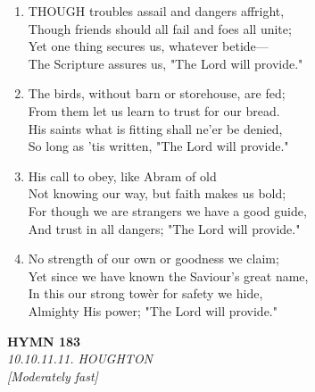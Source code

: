 \documentclass[11pt,a4paper]{article}
\begin{document}
\begin{enumerate}
    \item THOUGH troubles assail and dangers affright, \\
        Though friends should all fail and foes all unite; \\
        Yet one thing secures us, whatever betide--- \\
        The Scripture assures us, "The Lord will provide."

    \item The birds, without barn or storehouse, are fed; \\
        From them let us learn to trust for our bread. \\
        His saints what is fitting shall ne'er be denied, \\
        So long as 'tis written, "The Lord will provide."

    \item His call to obey, like Abram of old \\
        Not knowing our way, but faith makes us bold; \\
        For though we are strangers we have a good guide, \\
        And trust in all dangers; "The Lord will provide."

    \item No strength of our own or goodness we claim; \\
        Yet since we have known the Saviour's great name, \\
        In this our strong tow\`er for safety we hide, \\
        Almighty His power; "The Lord will provide."

\end{enumerate}

\newpage
\begin{center}
    {\Large \textbf{HYMN 183}}
    \\
    \textit{10.10.11.11. HOUGHTON}
    \\
    \textit{\small [Moderately fast]}
\end{center}
\vspace{1em}
\end{document}

